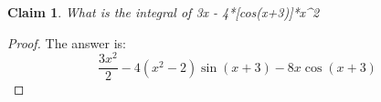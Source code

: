 \documentclass{article}
\newtheorem{theorem}{Claim}
\begin{document}
\begin{theorem}
What is the integral of 3x - 4*[cos(x+3)]*x^2
\end{theorem}

\begin{proof}
The answer is:
\[
\frac{3 x^2}{2}-4 \left(x^2-2\right) \sin (x+3)-8 x \cos (x+3)
\]
\end{proof}
\end{document}
